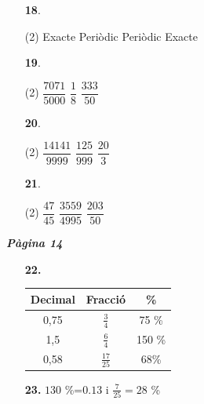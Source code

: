 \documentclass[a4paper, pdf, twoside]{book}
\begin{document}
\begin{multicols}{2}
\begin{enumerate}

 \item[\fontfamily{phv}\selectfont\color{blue}\textbf{18}. ] 
 \begin{tasks}[column-sep=1em, item-indent=1.3333em](2)
	 \task Exacte
	 \task Periòdic
	 \task Periòdic
	 \task Exacte
\end{tasks}
\vspace{0.25cm}



 \item[\fontfamily{phv}\selectfont\color{blue}\textbf{19}. ] 
 \begin{tasks}[column-sep=1em, item-indent=1.3333em](2)
	 \task $\dfrac {7071}{5000}$
	 \task $\dfrac {1}{8}$
	 \task $\dfrac {333}{50}$
\end{tasks}
\vspace{0.25cm}



 \item[\fontfamily{phv}\selectfont\color{blue}\textbf{20}. ] 
 \begin{tasks}[column-sep=1em, item-indent=1.3333em](2)
	 \task $\dfrac {14141}{9999}$
	 \task $\dfrac {125}{999}$
	 \task $\dfrac {20}{3}$
\end{tasks}
\vspace{0.25cm}



 \item[\fontfamily{phv}\selectfont\color{blue}\textbf{21}. ] 
 \begin{tasks}[column-sep=1em, item-indent=1.3333em](2)
	 \task $\dfrac {47}{45}$
	 \task $\dfrac {3559}{4995}$
	 \task $\dfrac {203}{50}$
\end{tasks}
 \end{enumerate}
\vspace{0.3cm}


{\textbf{\em Pàgina 14}} \hrulefill
\begin{enumerate}
\vspace{0.25cm}
\item[\fontfamily{phv}\selectfont\color{blue}\textbf{22. }] 
 {\renewcommand {\arraystretch }{1.8} \begin {tabular}{|c|c|c|} \hline \rowcolor {lightgray} Decimal & Fracció & \% \\ \hline 0,75 & $\frac {3}{4}$ & 75 \% \\ \hline 1,5 & $\frac {6}{4}$ & 150 \% \\ \hline 0,58 & $\frac {17}{25}$ & 68\% \\ \hline \end {tabular}} 
 \end{enumerate}
\begin{enumerate}
\vspace{0.25cm}
\item[\fontfamily{phv}\selectfont\color{blue}\textbf{23. }] 
$130$ \%=$0.13$ i $\frac {7}{25}=28$ \%
\vspace{0.25cm}



\end{enumerate}
\end{multicols}
\end{document}
